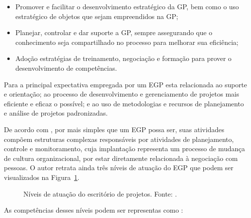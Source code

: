   \begin{itemize}
    \item Promover e facilitar o desenvolvimento estratégico da GP, bem como o uso estratégico de objetos que sejam empreendidos na GP;
    \item Planejar, controlar e dar suporte a GP, sempre assegurando que o conhecimento seja compartilhado no processo para melhorar sua eficiência;
    \item Adoção estratégias de treinamento, negociação e formação para prover o desenvolvimento de competências.
  \end{itemize}

  Para  a principal expectativa empregada por um EGP esta relacionada ao suporte e orientação; ao processo de desenvolvimento e gerenciamento de projetos mais eficiente e eficaz o possível; e ao uso de metodologias e recursos de planejamento e análise de projetos padronizadas.

  De acordo com , por mais simples que um EGP possa ser, suas atividades compõem estruturas complexas responsáveis por atividades de planejamento, controle e monitoramento, cuja implantação representa um processo de mudança de cultura organizacional, por estar diretamente relacionada à negociação com pessoas. O autor retrata ainda três níveis de atuação do EGP que podem ser visualizados na Figura~\ref{pmo_crawford}.

  \begin{figure}[ht]
    \centering
    \caption{Níveis de atuação do escritório de projetos. Fonte: \cite{crawford2010strategic}.}
    \label{pmo_crawford}
  \end{figure}

  As competências desses níveis podem ser representas como \cite{crawford2010strategic}:

